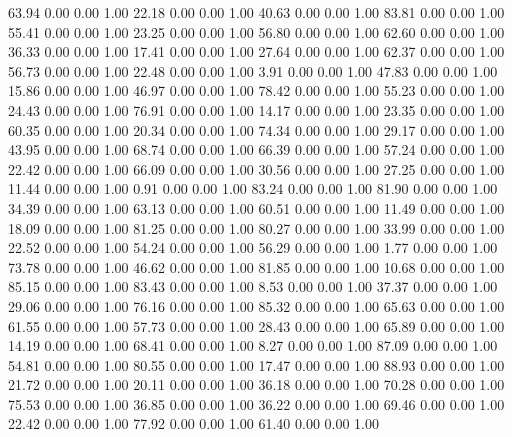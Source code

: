    63.94   0.00   0.00   1.00
   22.18   0.00   0.00   1.00
   40.63   0.00   0.00   1.00
   83.81   0.00   0.00   1.00
   55.41   0.00   0.00   1.00
   23.25   0.00   0.00   1.00
   56.80   0.00   0.00   1.00
   62.60   0.00   0.00   1.00
   36.33   0.00   0.00   1.00
   17.41   0.00   0.00   1.00
   27.64   0.00   0.00   1.00
   62.37   0.00   0.00   1.00
   56.73   0.00   0.00   1.00
   22.48   0.00   0.00   1.00
    3.91   0.00   0.00   1.00
   47.83   0.00   0.00   1.00
   15.86   0.00   0.00   1.00
   46.97   0.00   0.00   1.00
   78.42   0.00   0.00   1.00
   55.23   0.00   0.00   1.00
   24.43   0.00   0.00   1.00
   76.91   0.00   0.00   1.00
   14.17   0.00   0.00   1.00
   23.35   0.00   0.00   1.00
   60.35   0.00   0.00   1.00
   20.34   0.00   0.00   1.00
   74.34   0.00   0.00   1.00
   29.17   0.00   0.00   1.00
   43.95   0.00   0.00   1.00
   68.74   0.00   0.00   1.00
   66.39   0.00   0.00   1.00
   57.24   0.00   0.00   1.00
   22.42   0.00   0.00   1.00
   66.09   0.00   0.00   1.00
   30.56   0.00   0.00   1.00
   27.25   0.00   0.00   1.00
   11.44   0.00   0.00   1.00
    0.91   0.00   0.00   1.00
   83.24   0.00   0.00   1.00
   81.90   0.00   0.00   1.00
   34.39   0.00   0.00   1.00
   63.13   0.00   0.00   1.00
   60.51   0.00   0.00   1.00
   11.49   0.00   0.00   1.00
   18.09   0.00   0.00   1.00
   81.25   0.00   0.00   1.00
   80.27   0.00   0.00   1.00
   33.99   0.00   0.00   1.00
   22.52   0.00   0.00   1.00
   54.24   0.00   0.00   1.00
   56.29   0.00   0.00   1.00
    1.77   0.00   0.00   1.00
   73.78   0.00   0.00   1.00
   46.62   0.00   0.00   1.00
   81.85   0.00   0.00   1.00
   10.68   0.00   0.00   1.00
   85.15   0.00   0.00   1.00
   83.43   0.00   0.00   1.00
    8.53   0.00   0.00   1.00
   37.37   0.00   0.00   1.00
   29.06   0.00   0.00   1.00
   76.16   0.00   0.00   1.00
   85.32   0.00   0.00   1.00
   65.63   0.00   0.00   1.00
   61.55   0.00   0.00   1.00
   57.73   0.00   0.00   1.00
   28.43   0.00   0.00   1.00
   65.89   0.00   0.00   1.00
   14.19   0.00   0.00   1.00
   68.41   0.00   0.00   1.00
    8.27   0.00   0.00   1.00
   87.09   0.00   0.00   1.00
   54.81   0.00   0.00   1.00
   80.55   0.00   0.00   1.00
   17.47   0.00   0.00   1.00
   88.93   0.00   0.00   1.00
   21.72   0.00   0.00   1.00
   20.11   0.00   0.00   1.00
   36.18   0.00   0.00   1.00
   70.28   0.00   0.00   1.00
   75.53   0.00   0.00   1.00
   36.85   0.00   0.00   1.00
   36.22   0.00   0.00   1.00
   69.46   0.00   0.00   1.00
   22.42   0.00   0.00   1.00
   77.92   0.00   0.00   1.00
   61.40   0.00   0.00   1.00
